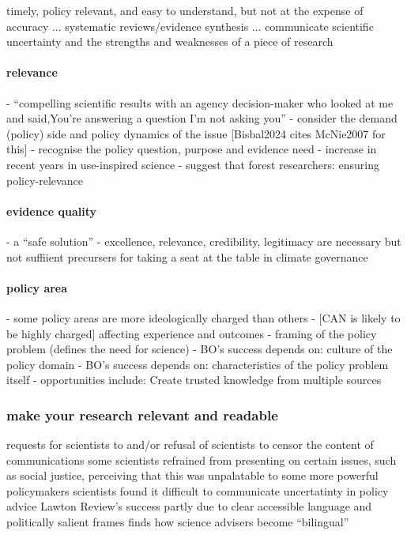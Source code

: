  timely, policy relevant, and easy to understand, but not at the expense of accuracy ... systematic reviews/evidence synthesis ... communicate scientific uncertainty and the strengths and weaknesses of a piece of research
\paragraph{relevance}
\cite{Gerber2023} - ``compelling scientific results with an agency decision-maker who looked at me and said,You're answering a question I'm not asking you''
\cite{GluckmanBK2021} - consider the demand (policy) side and policy dynamics of the issue [Bisbal2024 cites McNie2007 for this]
\cite{GluckmanBK2021} - recognise the policy question, purpose and evidence need
\cite{LubchencoR2020} - increase in recent years in use-inspired science
\cite{OjanenBKP2021} - suggest that forest researchers: ensuring policy-relevance
\paragraph{evidence quality}
\cite{CairneyO2020} - a ``safe solution''
\cite{IbarraJOBCIMRS2022} - excellence, relevance, credibility, legitimacy are necessary but not suffiient precursers for taking a seat at the table in climate governance
\paragraph{policy area}
\cite{SaxonbergSL2023} - some policy areas are more ideologically charged than others - [CAN is likely to be highly charged] affecting experience and outcomes 
\cite{WesselinkH2020} - framing of the policy problem (defines the need for science)
\cite{WesselinkH2020} - BO's success depends on: culture of the policy domain
\cite{WesselinkH2020} - BO's success depends on: characteristics of the policy problem itself
\cite{MoallemiZHSMZHKHMGLB2023} - opportunities include: Create trusted knowledge from multiple sources

\subsubsection{make your research relevant and readable}
\cite{OjanenBKP2021} requests for scientists to and/or refusal of scientists to censor the content of communications
\cite{OjanenBKP2021} some scientists refrained from presenting on certain issues, such as social justice, perceiving that this was unpalatable to some more powerful policymakers
\cite{IbarraJOBCIMRS2022} scientists found it difficult to communicate uncertatinty in policy advice
\cite{RoseBOP2018} Lawton Review's success partly due to clear accessible language and politically salient frames
\cite{Obermeister2022} finds how science advisers become ``bilingual''

